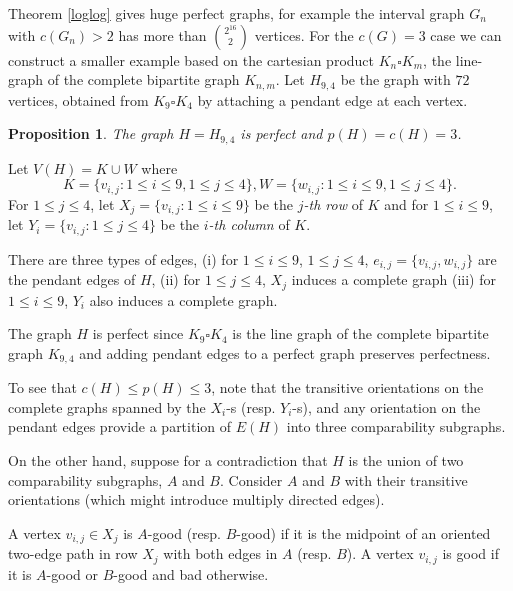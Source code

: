 \documentclass[12pt]{article}
\newtheorem{proposition}[theorem]{Proposition}
\begin{document}
Theorem \ref{loglog} gives huge perfect graphs, for example the interval graph $G_n$
with $c(G_n)>2$  has more than
$2^{16}\choose 2$ vertices.
For the $c(G)=3$ case we can construct a smaller
example  based on the cartesian product  $K_n\square K_m$, the line-graph of the complete bipartite graph $K_{n,m}$.
Let $H_{9,4}$ be the graph with $72$ vertices,
obtained from $K_9\square K_4$ by attaching a pendant edge at each vertex.


\begin{proposition}\label{H9} The graph $H=H_{9,4}$ is perfect and $p(H)=c(H)=3$.
\end{proposition}

\medskip




Let $V(H)=K\cup W$ where
$$K=\{v_{i,j}: 1\le i\le 9, 1\le j\le 4\}, W=\{w_{i,j}:  1\le i\le 9, 1\le j\le 4\}.$$
For $1\le j\le 4$, let $X_j=\{v_{i, j} : 1\le i \le 9\}$ be the {\em $j$-th row} of $K$ and
for  $1\le i\le 9$, let $Y_i=\{v_{i, j} : 1\le j \le 4\}$ be the {\em $i$-th column} of $K$.

There are three types of edges,
(i)  for  $1\le i\le 9$, $1\le j\le 4$,  $e_{i,j}=\{v_{i,j},w_{i,j}\}$ are the pendant edges of $H$,
(ii) for $1\le j\le 4$, $X_j$ induces a complete graph
(iii)  for $1\le i\le 9$, $Y_i$ also induces a complete graph.

  The graph $H$ is perfect since $K_9\square K_4$ is the line graph of the complete bipartite graph
  $K_{9,4}$ and adding pendant edges to a perfect graph preserves perfectness.

  To see that $c(H)\le p(H)\le 3$,
  note that the transitive orientations on the complete graphs spanned by the
  $X_i$-s (resp. $Y_i$-s), and any orientation on the pendant edges provide a partition of $E(H)$ into three comparability subgraphs.

  On the other hand, suppose for a contradiction that
  $H$  is the union of two comparability subgraphs, $A$ and $B$.
Consider $A$ and $B$
with their transitive orientations (which might introduce multiply directed edges).

A vertex $v_{i,j}\in X_j$ is  $A$-good (resp. $B$-good)
if it is
the midpoint of an oriented two-edge path in
row $X_j$ with both edges in $A$ (resp. $B$).
A vertex $v_{i,j}$ is good if it is $A$-good or $B$-good and bad otherwise.
\end{document}
